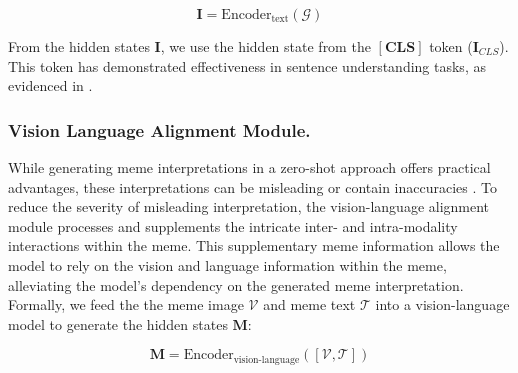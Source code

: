 \begin{equation*}
    \mathbf{I} = \text{Encoder}_\text{text}(\mathcal{G})
\end{equation*}

From the hidden states $\mathbf{I}$, we use the hidden state from the $\mathbf{[CLS]}$ token ($\mathbf{I}_{CLS}$). This token has demonstrated effectiveness in sentence understanding tasks, as evidenced in \cite{reimers2019sentence,liu2019roberta}.

\subsubsection{Vision Language Alignment Module.} 
While generating meme interpretations in a zero-shot approach offers practical advantages, these interpretations can be misleading or contain inaccuracies \cite{ji2023survey}. To reduce the severity of misleading interpretation, the vision-language alignment module processes and supplements the intricate inter- and intra-modality interactions within the meme. This supplementary meme information allows the model to rely on the vision and language information within the meme, alleviating the model’s dependency on the generated meme interpretation. Formally, we feed the the meme image $\mathcal{V}$ and meme text $\mathcal{T}$ into a vision-language model to generate the hidden states $\mathbf{M}$:

\begin{equation*}
    \mathbf{M} = \text{Encoder}_\text{vision-language}([\mathcal{V}, \mathcal{T}])
\end{equation*}

